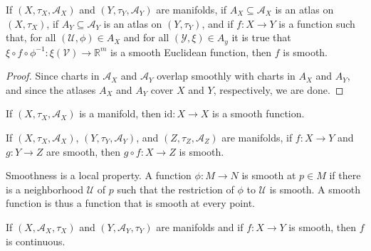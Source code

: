\documentclass[oneside]{book}                                                  %
\begin{document}
                \begin{theorem}
                    If $(X,\tau_{X},\mathcal{A}_{X})$ and
                    $(Y,\tau_{Y},\mathcal{A}_{Y})$ are manifolds, if
                    $A_{X}\subseteq\mathcal{A}_{X}$ is an atlas on $(X,\tau_{X})$,
                    if $A_{Y}\subseteq\mathcal{A}_{Y}$ is an atlas on
                    $(Y,\tau_{Y})$, and if $f:X\rightarrow{Y}$ is a function such
                    that, for all $(\mathcal{U},\phi)\in{A}_{X}$ and for all
                    $(\mathcal{Y},\xi)\in{A}_{y}$ it is true that
                    $\xi\circ{f}\circ\phi^{\minus{1}}:\xi(\mathcal{V})%
                     \rightarrow\mathbb{R}^{m}$ is a smooth Euclidean function,
                    then $f$ is smooth.
                \end{theorem}
                \begin{proof}
                    Since charts in $\mathcal{A}_{X}$ and $\mathcal{A}_{Y}$
                    overlap smoothly with charts in $A_{X}$ and $A_{Y}$, and since
                    the atlases $A_{X}$ and $A_{Y}$ cover $X$ and $Y$, respectively,
                    we are done.
                \end{proof}
                \begin{theorem}
                    If $(X,\tau_{X},\mathcal{A}_{X})$ is a manifold, then
                    $\textrm{id}:X\rightarrow{X}$ is a smooth function.
                \end{theorem}
                \begin{theorem}
                    If $(X,\tau_{X},\mathcal{A}_{X})$,
                    $(Y,\tau_{Y},\mathcal{A}_{Y})$, and
                    $(Z,\tau_{Z},\mathcal{A}_{Z})$ are manifolds, if
                    $f:X\rightarrow{Y}$ and $g:Y\rightarrow{Z}$ are smooth, then
                    $g\circ{f}:X\rightarrow{Z}$ is smooth.
                \end{theorem}
                Smoothness is a local property. A function $\phi:M\rightarrow{N}$
                is smooth at $p\in{M}$ if there is a neighborhood
                $\mathcal{U}$ of $p$ such that the restriction of $\phi$ to
                $\mathcal{U}$ is smooth. A smooth function is thus a function
                that is smooth at every point.
                \begin{theorem}
                    If $(X,\mathcal{A}_{X},\tau_{X})$ and
                    $(Y,\mathcal{A}_{Y},\tau_{Y})$ are manifolds and if
                    $f:X\rightarrow{Y}$ is smooth, then $f$ is continuous.
                \end{theorem}
\end{document}
